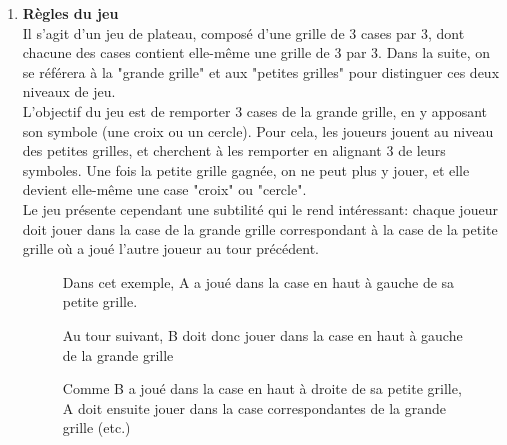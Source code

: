 \documentclass[10pt]{article}
\begin{document}
    \begin{enumerate}
    
\item \textbf{Règles du jeu}\\

Il s'agit d'un jeu de plateau, composé d'une grille de 3 cases par 3, dont chacune des cases contient elle-même une grille de 3 par 3. Dans la suite, on se référera à la "grande grille" et aux "petites grilles" pour distinguer ces deux niveaux de jeu.\\
L'objectif du jeu est de remporter 3 cases de la grande grille, en y apposant son symbole (une croix ou un cercle). Pour cela, les joueurs jouent au niveau des petites grilles, et cherchent à les remporter en alignant 3 de leurs symboles. Une fois la petite grille gagnée, on ne peut plus y jouer, et elle devient elle-même une case "croix" ou "cercle". \\
Le jeu présente cependant une subtilité qui le rend intéressant: chaque joueur doit jouer dans la case de la grande grille correspondant à la case de la petite grille où a joué l'autre joueur au tour précédent.




\begin{figure}
 \begin{minipage}[t]{0.25\linewidth}
  \centering{}
  \caption{Dans cet exemple, A a joué dans la case en haut à gauche de sa petite grille.}
 \end{minipage} \hfill
 \begin{minipage}[t]{0.25\linewidth}
  \centering{}
  \caption{Au tour suivant, B doit donc jouer dans la case en haut à gauche de la grande grille}
  \end{minipage} \hfill
 \begin{minipage}[t]{0.25\linewidth}
  \centering{}
  \caption{Comme B a joué dans la case en haut à droite de sa petite grille, A doit ensuite jouer dans la case correspondantes de la grande grille (etc.)}
 \end{minipage}
\end{figure}



\end{enumerate}
\end{document}
